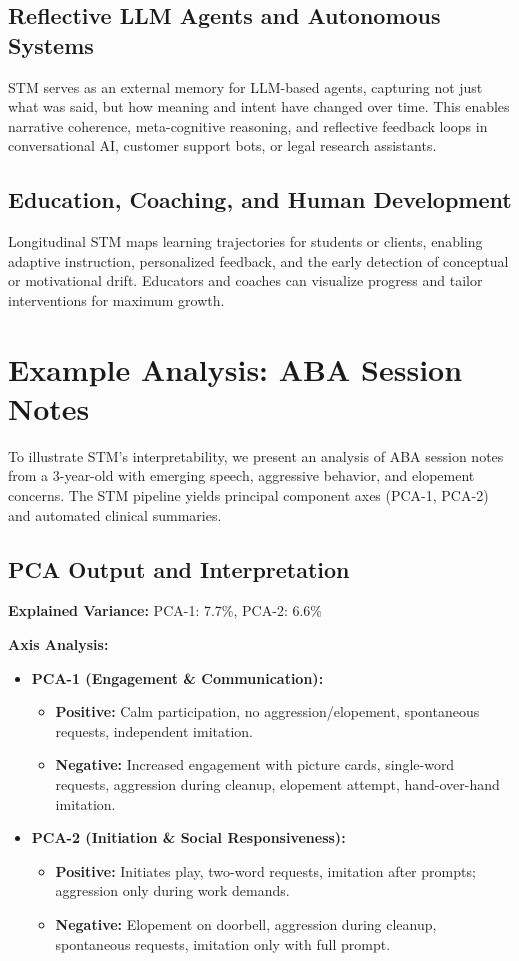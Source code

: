 \documentclass[11pt]{article}
\begin{document}
\subsection{Reflective LLM Agents and Autonomous Systems}
STM serves as an external memory for LLM-based agents, capturing not just what was said, but how meaning and intent have changed over time. This enables narrative coherence, meta-cognitive reasoning, and reflective feedback loops in conversational AI, customer support bots, or legal research assistants.

\subsection{Education, Coaching, and Human Development}
Longitudinal STM maps learning trajectories for students or clients, enabling adaptive instruction, personalized feedback, and the early detection of conceptual or motivational drift. Educators and coaches can visualize progress and tailor interventions for maximum growth.

\section{Example Analysis: ABA Session Notes}

To illustrate STM's interpretability, we present an analysis of ABA session notes from a 3-year-old with emerging speech, aggressive behavior, and elopement concerns. The STM pipeline yields principal component axes (PCA-1, PCA-2) and automated clinical summaries.

\subsection{PCA Output and Interpretation}

\textbf{Explained Variance:} PCA-1: 7.7\%, PCA-2: 6.6\%

\textbf{Axis Analysis:}
\begin{itemize}[leftmargin=2em]
    \item \textbf{PCA-1 (Engagement \& Communication):} 
    \begin{itemize}
        \item \textbf{Positive:} Calm participation, no aggression/elopement, spontaneous requests, independent imitation.
        \item \textbf{Negative:} Increased engagement with picture cards, single-word requests, aggression during cleanup, elopement attempt, hand-over-hand imitation.
    \end{itemize}
    \item \textbf{PCA-2 (Initiation \& Social Responsiveness):}
    \begin{itemize}
        \item \textbf{Positive:} Initiates play, two-word requests, imitation after prompts; aggression only during work demands.
        \item \textbf{Negative:} Elopement on doorbell, aggression during cleanup, spontaneous requests, imitation only with full prompt.
    \end{itemize}
\end{itemize}
\end{document}
